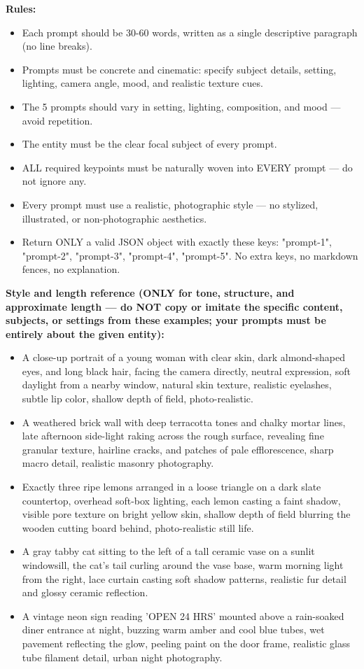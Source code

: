 \documentclass{llmxive}
\begin{document}
\begin{tcolorbox}
\textbf{Rules:}
\begin{itemize}[leftmargin=1.5em, nosep]
    \item Each prompt should be 30-60 words, written as a single descriptive paragraph (no line breaks).
    \item Prompts must be concrete and cinematic: specify subject details, setting, lighting, camera angle, mood, and realistic texture cues.
    \item The 5 prompts should vary in setting, lighting, composition, and mood — avoid repetition.
    \item The entity must be the clear focal subject of every prompt.
    \item ALL required keypoints must be naturally woven into EVERY prompt — do not ignore any.
    \item Every prompt must use a realistic, photographic style — no stylized, illustrated, or non-photographic aesthetics.
    \item Return ONLY a valid JSON object with exactly these keys: "prompt-1", "prompt-2", "prompt-3", "prompt-4", "prompt-5". No extra keys, no markdown fences, no explanation.
\end{itemize}

\textbf{Style and length reference (ONLY for tone, structure, and approximate length — do NOT copy or imitate the specific content, subjects, or settings from these examples; your prompts must be entirely about the given entity):}
\begin{itemize}[leftmargin=1.5em, nosep]
    \item A close-up portrait of a young woman with clear skin, dark almond-shaped eyes, and long black hair, facing the camera directly, neutral expression, soft daylight from a nearby window, natural skin texture, realistic eyelashes, subtle lip color, shallow depth of field, photo-realistic.
    \item A weathered brick wall with deep terracotta tones and chalky mortar lines, late afternoon side-light raking across the rough surface, revealing fine granular texture, hairline cracks, and patches of pale efflorescence, sharp macro detail, realistic masonry photography.
    \item Exactly three ripe lemons arranged in a loose triangle on a dark slate countertop, overhead soft-box lighting, each lemon casting a faint shadow, visible pore texture on bright yellow skin, shallow depth of field blurring the wooden cutting board behind, photo-realistic still life.
    \item A gray tabby cat sitting to the left of a tall ceramic vase on a sunlit windowsill, the cat's tail curling around the vase base, warm morning light from the right, lace curtain casting soft shadow patterns, realistic fur detail and glossy ceramic reflection.
    \item A vintage neon sign reading 'OPEN 24 HRS' mounted above a rain-soaked diner entrance at night, buzzing warm amber and cool blue tubes, wet pavement reflecting the glow, peeling paint on the door frame, realistic glass tube filament detail, urban night photography.
\end{itemize}
\end{tcolorbox}
\end{document}
